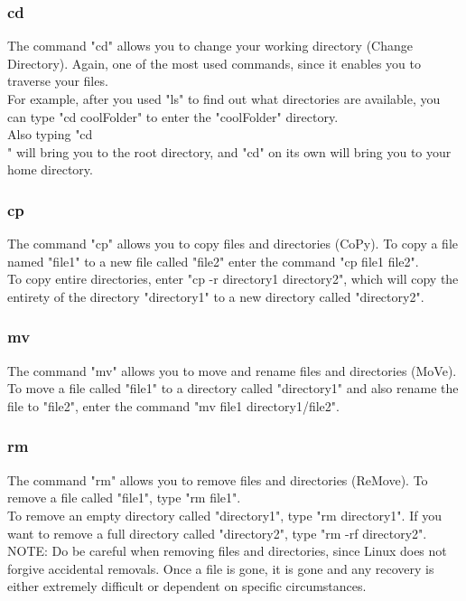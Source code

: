 \documentclass[12pt,article]{memoir}
\begin{document}
\subsubsection{cd}
The command "cd" allows you to change your working directory (Change Directory). Again, one of the most used commands, since it enables you to traverse your files.\\
\noindent
For example, after you used "ls" to find out what directories are available, you can type "cd coolFolder" to enter the "coolFolder" directory.\\
Also typing "cd \\" will bring you to the root directory, and "cd" on its own will bring you to your home directory.


\subsubsection{cp}
The command "cp" allows you to copy files and directories (CoPy). To copy a file named "file1" to a new file called "file2" enter the command "cp file1 file2".\\
\noindent
To copy entire directories, enter "cp -r directory1 directory2", which will copy the entirety of the directory "directory1" to a new directory called "directory2".

\newpage
\subsubsection{mv}
The command "mv" allows you to move and rename files and directories (MoVe). To move a file called "file1" to a directory called "directory1" and also rename the file to "file2", enter the command "mv file1 directory1/file2".

\subsubsection{rm}
The command "rm" allows you to remove files and directories (ReMove). To remove a file called "file1", type "rm file1".\\
\noindent
To remove an empty directory called "directory1", type "rm directory1". If you want to remove a full directory called "directory2", type "rm -rf directory2".\\
NOTE: Do be careful when removing files and directories, since Linux does not forgive accidental removals. Once a file is gone, it is gone and any recovery is either extremely difficult or dependent on specific circumstances.
\end{document}
